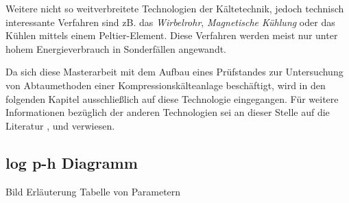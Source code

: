 Weitere nicht so weitverbreitete Technologien der Kältetechnik, jedoch technisch interessante Verfahren  sind zB. das  \textit{Wirbelrohr},  \textit{Magnetische Kühlung} oder das Kühlen mittels einem Peltier-Element. Diese Verfahren werden meist nur unter hohem Energieverbrauch in Sonderfällen angewandt. \citep{Grote2014}

Da sich diese Masterarbeit mit dem Aufbau eines Prüfstandes zur Untersuchung von Abtaumethoden einer Kompressionskälteanlage beschäftigt, wird in den folgenden Kapitel ausschließlich auf diese Technologie eingegangen. Für weitere Informationen bezüglich der anderen Technologien sei an dieser Stelle auf die Literatur \citep{Baehr2013}, \citep{Grote2014} und \citep{Grote2014} verwiesen.





\subsection{log p-h Diagramm}
\label{subsec:log p-h Diagramm}

Bild
Erläuterung
Tabelle von Parametern